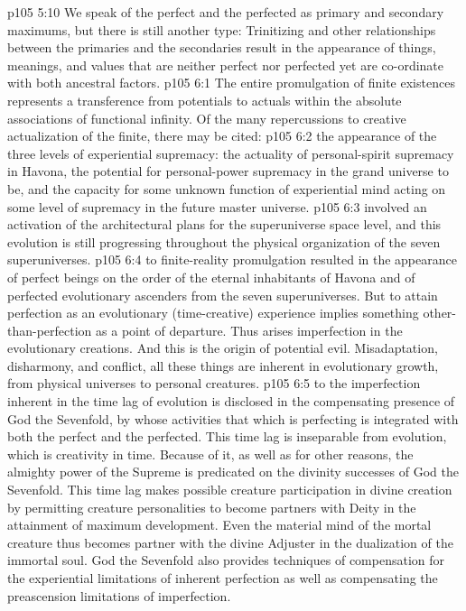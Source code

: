 \vs p105 5:10 We speak of the perfect and the perfected as primary and secondary maximums, but there is still another type: Trinitizing and other relationships between the primaries and the secondaries result in the appearance of  things, meanings, and values that are neither perfect nor perfected yet are co\hyp{}ordinate with both ancestral factors.
\vs p105 6:1 The entire promulgation of finite existences represents a transference from potentials to actuals within the absolute associations of functional infinity. Of the many repercussions to creative actualization of the finite, there may be cited:
\vs p105 6:2 \bibnobreakspace {} the appearance of the three levels of experiential supremacy: the actuality of personal\hyp{}spirit supremacy in Havona, the potential for personal\hyp{}power supremacy in the grand universe to be, and the capacity for some unknown function of experiential mind acting on some level of supremacy in the future master universe.
\vs p105 6:3 \pc {}\bibnobreakspace {} involved an activation of the architectural plans for the superuniverse space level, and this evolution is still progressing throughout the physical organization of the seven superuniverses.
\vs p105 6:4 \pc {}\bibnobreakspace {} to finite\hyp{}reality promulgation resulted in the appearance of perfect beings on the order of the eternal inhabitants of Havona and of perfected evolutionary ascenders from the seven superuniverses. But to attain perfection as an evolutionary (time\hyp{}creative) experience implies something other\hyp{}than\hyp{}perfection as a point of departure. Thus arises imperfection in the evolutionary creations. And this is the origin of potential evil. Misadaptation, disharmony, and conflict, all these things are inherent in evolutionary growth, from physical universes to personal creatures.
\vs p105 6:5 \pc {}\bibnobreakspace {} to the imperfection inherent in the time lag of evolution is disclosed in the compensating presence of God the Sevenfold, by whose activities that which is perfecting is integrated with both the perfect and the perfected. This time lag is inseparable from evolution, which is creativity in time. Because of it, as well as for other reasons, the almighty power of the Supreme is predicated on the divinity successes of God the Sevenfold. This time lag makes possible creature participation in divine creation by permitting creature personalities to become partners with Deity in the attainment of maximum development. Even the material mind of the mortal creature thus becomes partner with the divine Adjuster in the dualization of the immortal soul. God the Sevenfold also provides techniques of compensation for the experiential limitations of inherent perfection as well as compensating the preascension limitations of imperfection.
